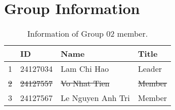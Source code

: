 \section{Group Information}
\label{sec:group-information-section}

\renewcommand{\arraystretch}{1.5}
\begin{table}[ht]
    \centering
    \begin{tabular}{| m{1.75cm} | m{2cm} | m{5cm}| m{2.5cm} |} 
    \hline
    \textbf{} & \textbf{ID} & \textbf{Name} & \textbf{Title} \\ 
    \hline
    1 & 24127034 & Lam Chi Hao & Leader \\ 
    \hline
    \sout{2} & \sout{24127557} & \sout{Vo Nhat Tien} & \sout{Member} \\ 
    \hline
    3 & 24127567 & Le Nguyen Anh Tri & Member \\ 
    \hline
    \end{tabular}
    \caption{Information of Group 02 member.}
    \label{tab:group-information-table}
\end{table}
